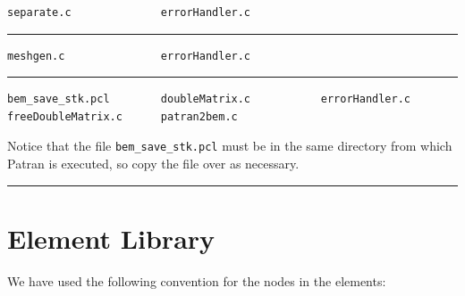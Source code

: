 \documentclass[12pt]{article}
\begin{document}
\small\begin{verbatim}
separate.c              errorHandler.c
\end{verbatim}\normalsize

\hrule


\small\begin{verbatim}
meshgen.c               errorHandler.c
\end{verbatim}\normalsize

\hrule


\small\begin{verbatim}
bem_save_stk.pcl        doubleMatrix.c           errorHandler.c
freeDoubleMatrix.c      patran2bem.c
\end{verbatim}\normalsize

Notice that the file \verb+bem_save_stk.pcl+ must be in the same directory from which Patran is executed, so copy the file over as necessary.

\vspace{12pt}\hrule

\pagebreak
\section{Element Library}
We have used the following convention for the nodes in the elements:
\end{document}
